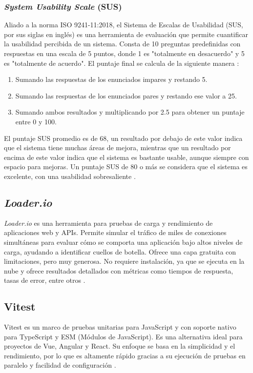 \subsubsection{\textit{System Usability Scale} (SUS)}
Aliado a la norma ISO 9241-11:2018, el Sistema de Escalas de Usabilidad (SUS, por sus siglas en inglés) es una herramienta de evaluación
que permite cuantificar la usabilidad percibida de un sistema.
Consta de 10 preguntas predefinidas con respuestas en una escala de 5 puntos, donde 1 es "totalmente en desacuerdo" y 5 
es "totalmente de acuerdo". El puntaje final se calcula de la siguiente manera \cite{brooke1996sus}:
\begin{enumerate}
    \item Sumando las respuestas de los enunciados impares y restando 5.
    \item Sumando las respuestas de los enunciados pares y restando ese valor a 25.
    \item Sumando ambos resultados y multiplicando por 2.5 para obtener un puntaje entre 0 y 100.
\end{enumerate}
El puntaje SUS promedio es de 68, un resultado por debajo de este valor indica que el sistema tiene muchas áreas de mejora, mientras que un
resultado por encima de este valor indica que el sistema es bastante usable, aunque siempre con espacio para mejoras. Un puntaje SUS de 80 o
más se considera que el sistema es excelente, con una usabilidad sobresaliente \cite{sauro2011sus}.

\subsection{\textit{Loader.io}}
\textit{Loader.io} es una herramienta para pruebas de carga y rendimiento de aplicaciones web y APIs. Permite simular el tráfico de miles de
conexiones simultáneas para evaluar cómo se comporta una aplicación bajo altos niveles de carga, ayudando a identificar cuellos de botella.
Ofrece una capa gratuita con limitaciones, pero muy generosa. No requiere instalación, ya que se ejecuta en la nube y ofrece resultados
detallados con métricas como tiempos de respuesta, tasas de error, entre otros \cite{loaderio2025docs}.

\subsection{Vitest}
Vitest es un marco de pruebas unitarias para JavaScript y con soporte nativo para TypeScript y ESM (Módulos de JavaScript). Es una alternativa
ideal para proyectos de Vue, Angular y React. Su enfoque se basa en la simplicidad y el rendimiento, por lo que es altamente rápido gracias a su
ejecución de pruebas en paralelo y facilidad de configuración \cite{vitest2026gettingStarted}.

